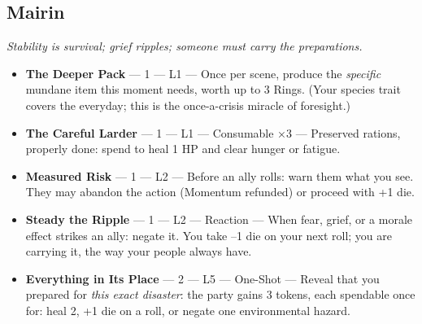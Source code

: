 \subsection{Mairin}
\textit{Stability is survival; grief ripples; someone must carry the preparations.}
\begin{itemize}
    \item \textbf{The Deeper Pack} --- 1 --- L1 --- Once per scene, produce the \textit{specific} mundane item this moment needs, worth up to 3 Rings. (Your species trait covers the everyday; this is the once-a-crisis miracle of foresight.)
    \item \textbf{The Careful Larder} --- 1 --- L1 --- Consumable ×3 --- Preserved rations, properly done: spend to heal 1 HP and clear hunger or fatigue.
    \item \textbf{Measured Risk} --- 1 --- L2 --- Before an ally rolls: warn them what you see. They may abandon the action (Momentum refunded) or proceed with +1 die.
    \item \textbf{Steady the Ripple} --- 1 --- L2 --- Reaction --- When fear, grief, or a morale effect strikes an ally: negate it. You take --1 die on your next roll; you are carrying it, the way your people always have.
    \item \textbf{Everything in Its Place} --- 2 --- L5 --- One-Shot --- Reveal that you prepared for \textit{this exact disaster}: the party gains 3 tokens, each spendable once for: heal 2, +1 die on a roll, or negate one environmental hazard.
\end{itemize}

